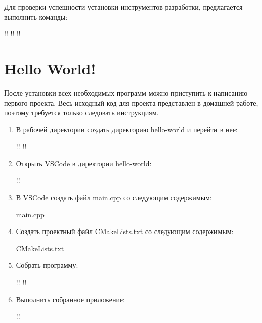 \documentclass[14pt]{extarticle}
\begin{document}
Для проверки успешности установки инструментов разработки, предлагается выполнить команды:

\begin{consolewindow}
!!
!!
!!
\end{consolewindow}

\section{Hello World!}

После установки всех необходимых программ можно приступить к написанию первого проекта.
Весь исходный код для проекта представлен в домашней работе, поэтому требуется только следовать
инструкциям.

\begin{enumerate}

        \item В рабочей директории создать директорию hello-world и перейти в нее:

            \begin{consolewindow}
!!
!!
            \end{consolewindow}

        \item Открыть VSCode в директории hello-world:

            \begin{consolewindow}
!!
            \end{consolewindow}

        \item В VSCode создать файл main.cpp со следующим содержимым:

                {main.cpp}

        \item Создать проектный файл CMakeLists.txt со следующим содержимым:

                {CMakeLists.txt}

        \item Собрать программу:

            \begin{consolewindow}
!!
!!
            \end{consolewindow}

        \item Выполнить собранное приложение:

            \begin{consolewindow}
!!
            \end{consolewindow}

\end{enumerate}
\end{document}
